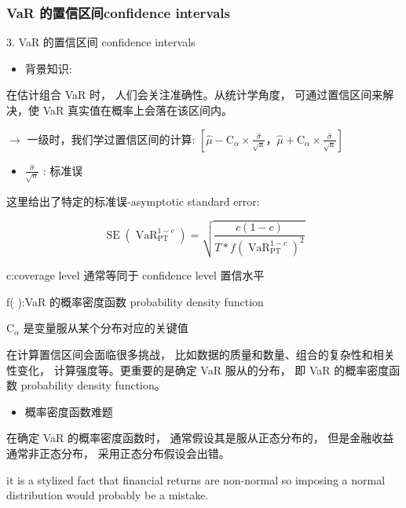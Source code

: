 \subsubsection{VaR 的置信区间confidence intervals}

3. VaR 的置信区间 confidence intervals

\begin{itemize}
\item 背景知识:
\end{itemize}

 在估计组合 VaR 时， 人们会关注准确性。从统计学角度， 可通过置信区间来解决，使 VaR 真实值在概率上会落在该区间内。

\(\rightarrow\) 一级时，我们学过置信区间的计算: \(\left\lbrack  {\widehat{\mu } - {\mathrm{C}}_{\alpha } \times  \frac{\widehat{\sigma }}{\sqrt{\mathrm{n}}}，\widehat{\mu } + {\mathrm{C}}_{\alpha } \times  \frac{\widehat{\sigma }}{\sqrt{\mathrm{n}}}}\right\rbrack\)

\begin{itemize}
\item \(\frac{\widehat{\sigma }}{\sqrt{n}}\) : 标准误
\end{itemize}

这里给出了特定的标准误-asymptotic standard error:

\[
\operatorname{SE}\left( {\operatorname{VaR}}_{\mathrm{{PT}}}^{1 - c}\right)  = \sqrt{\frac{c\left( {1 - c}\right) }{T * f{\left( {\operatorname{VaR}}_{\mathrm{{PT}}}^{1 - c}\right) }^{2}}}
\]

c:coverage level 通常等同于 confidence level 置信水平

f(   ):VaR 的概率密度函数 probability density function

\({\mathrm{C}}_{\alpha }\) 是变量服从某个分布对应的关键值

 在计算置信区间会面临很多挑战， 比如数据的质量和数量、组合的复杂性和相关性变化， 计算强度等。更重要的是确定 VaR 服从的分布， 即 VaR 的概率密度函数 probability density function。

\begin{itemize}
\item 概率密度函数难题
\end{itemize}

 在确定 VaR 的概率密度函数时， 通常假设其是服从正态分布的， 但是金融收益通常非正态分布， 采用正态分布假设会出错。

it is a stylized fact that financial returns are non-normal so imposing a normal distribution would probably be a mistake.

